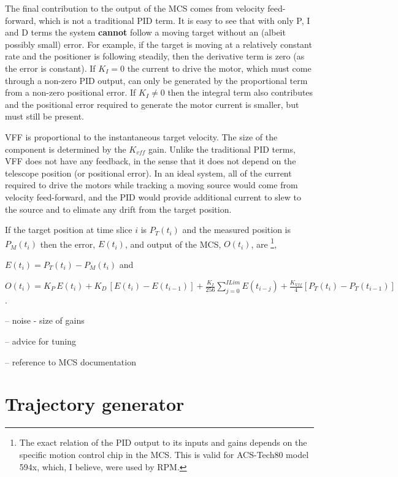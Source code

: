 \documentclass[letterpaper,12pt]{report}
\begin{document}
The final contribution to the output of the MCS comes from velocity
feed-forward, which is not a traditional PID term. It is easy to see
that with only P, I and D terms the system \textbf{cannot} follow a
moving target without an (albeit possibly small) error. For example,
if the target is moving at a relatively constant rate and the
positioner is following steadily, then the derivative term is zero (as
the error is constant). If $K_I=0$ the current to drive the motor,
which must come through a non-zero PID output, can only be generated
by the proportional term from a non-zero positional error. If $K_I \ne
0$ then the integral term also contributes and the positional error
required to generate the motor current is smaller, but must still be
present.

VFF is proportional to the instantaneous target velocity. The size of
the component is determined by the $K_{vff}$ gain. Unlike the
traditional PID terms, VFF does not have any feedback, in the sense
that it does not depend on the telescope position (or positional
error). In an ideal system, all of the current required to drive the
motors while tracking a moving source would come from velocity
feed-forward, and the PID would provide additional current to slew to
the source and to elimate any drift from the target position.

If the target position at time slice $i$ is $P_T(t_i)$ and the
measured position is $P_M(t_i)$ then the error, $E(t_i)$, and output
of the MCS, $O(t_i)$, are \footnote{The exact relation of the PID
output to its inputs and gains depends on the specific motion control
chip in the MCS. This is valid for ACS-Tech80 model 594x, which, I
believe, were used by RPM.},

$\displaystyle E(t_i) = P_T(t_i)-P_M(t_i)$ and

$\displaystyle O(t_i) = 
K_P\,E(t_i) + 
K_D\,\left[E(t_i)-E(t_{i-1})\right] +
\frac{K_I}{256} \sum_{j=0}^{ILim}E(t_{i-j}) +
\frac{K_{Vff}}{4}\left[P_T(t_i)-P_T(t_{i-1})\right]$.

-- noise - size of gains 

-- advice for tuning

-- reference to MCS documentation

\section{Trajectory generator}
\end{document}
